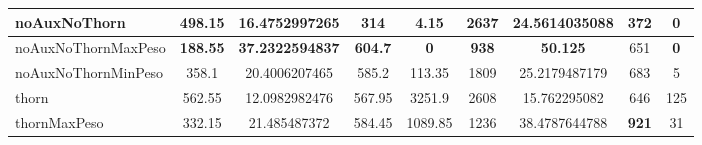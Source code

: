 \begin{table}
\begin{tabular}{l|c|c|c|c|c|c|c|c}
\rowcolor[HTML]{EFEFEF} 
noAuxNoThorn        & 498.15               & 16.4752997265                                                    & 314                                                                         & 4.15                                                                       & 2637               & 24.5614035088                                                  & 372                                                                     & \textbf{0}                                                             \\ \hline
noAuxNoThornMaxPeso & \textbf{188.55}      & \textbf{37.2322594837}                                           & \textbf{604.7}                                                              & \textbf{0}                                                                 & \textbf{938}       & \textbf{50.125}                                                & 651                                                                     & \textbf{0}                                                             \\ \hline
\rowcolor[HTML]{EFEFEF} 
noAuxNoThornMinPeso & 358.1                & 20.4006207465                                                    & 585.2                                                                       & 113.35                                                                     & 1809               & 25.2179487179                                                  & 683                                                                     & 5                                                                      \\ \hline
thorn               & 562.55               & 12.0982982476                                                    & 567.95                                                                      & 3251.9                                                                     & 2608               & 15.762295082                                                   & 646                                                                     & 125                                                                    \\ \hline
\rowcolor[HTML]{EFEFEF} 
thornMaxPeso        & 332.15               & 21.485487372                                                     & 584.45                                                                      & 1089.85                                                                    & 1236               & 38.4787644788                                                  & \textbf{921}                                                            & 31                                                                     \\ \hline

\end{tabular}
\end{table}
